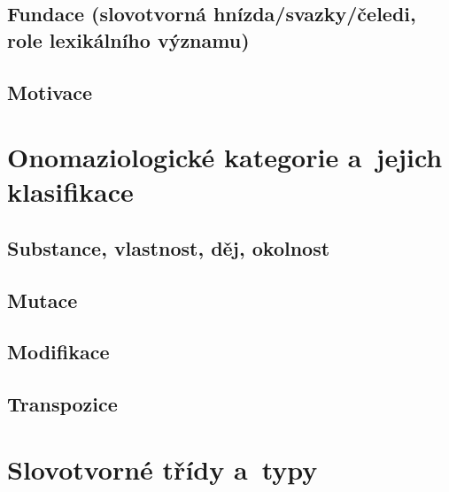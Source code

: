 \hypertarget{fundace-slovotvornuxe1-hnuxedzdasvazkyux10deledi-role-lexikuxe1lnuxedho-vuxfdznamu}{%
\subsection{Fundace (slovotvorná hnízda/svazky/čeledi, role
lexikálního
významu)}\label{fundace-slovotvornuxe1-hnuxedzdasvazkyux10deledi-role-lexikuxe1lnuxedho-vuxfdznamu}}

\hypertarget{motivace}{%
\subsection{Motivace}\label{motivace}}

\hypertarget{onomaziologickuxe9-kategorie-a-jejich-klasifikace}{%
\section{Onomaziologické kategorie a~jejich
klasifikace}\label{onomaziologickuxe9-kategorie-a-jejich-klasifikace}}

\hypertarget{substance-vlastnost-dux11bj-okolnost}{%
\subsection{Substance, vlastnost, děj,
okolnost}\label{substance-vlastnost-dux11bj-okolnost}}

\hypertarget{mutace}{%
\subsection{Mutace}\label{mutace}}

\hypertarget{modifikace}{%
\subsection{Modifikace}\label{modifikace}}

\hypertarget{transpozice}{%
\subsection{Transpozice}\label{transpozice}}

\hypertarget{slovotvornuxe9-tux159uxeddy-a-typy}{%
\section{Slovotvorné třídy
a~typy}\label{slovotvornuxe9-tux159uxeddy-a-typy}}

